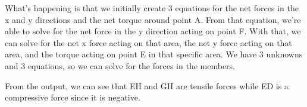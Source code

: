\documentclass{article}[14pt, letterpaper, Times New Roman]
\begin{document}
What's happening is that we initially create 3 equations for the net forces in the x and y directions and the net torque around point A.
From that equation, we're able to solve for the net force in the y direction acting on point F.
With that, we can solve for the net x force acting on that area, the net y force acting on that area, and the torque acting on point E in that specific area.
We have 3 unknowns and 3 equations, so we can solve for the forces in the members.

From the output, we can see that EH and GH are tensile forces while ED is a compressive force since it is negative.
\end{document}
